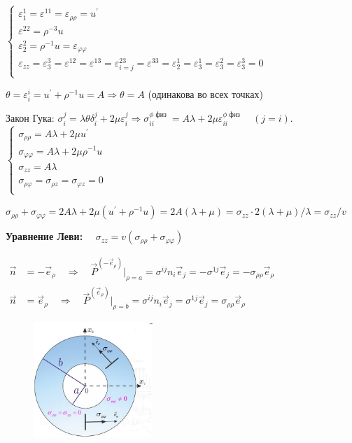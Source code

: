$\left\{\begin{array}{c}
   \varepsilon_1^1=\varepsilon^{11}=\varepsilon_{\rho \rho}=u^{\prime} \\
   \varepsilon^{22}=\rho^{-3} u \\
     \varepsilon_2^2=\rho^{-1} u=\varepsilon_{\varphi \varphi}\\
      \varepsilon_{z z}=\varepsilon_3^3=\varepsilon^{12}=\varepsilon^{13}=\varepsilon_{i=j}^{23}=\varepsilon^{33}=\varepsilon_2^1=\varepsilon_3^1=\varepsilon_3^2=\varepsilon_3^3=0 \\
        \end{array}\right.$


$\theta=\varepsilon_i^i=u^{\prime}+\rho^{-1} u=A \Rightarrow \theta=A $
(одинакова во всех точках)

Закон Гука:
$
\sigma_i^j=\lambda \theta \delta_i^j+2 \mu \varepsilon_i^j \Rightarrow \sigma_{i i}^{\phi \text { физ }}=A \lambda+2 \mu \varepsilon_{i i}^{\phi \text { физ }} \quad(j=i) \text {. } 
$
$\left\{ \begin{array}{c}
    \sigma_{\rho \rho}=A \lambda+2 \mu u^{\prime}\\
     \sigma_{\varphi \varphi}=A \lambda+2 \mu \rho^{-1} u  \\
   \sigma_{z z}=A \lambda \\
    \sigma_{\rho \varphi}=\sigma_{\rho z}=\sigma_{\varphi z}=0 \\
        \end{array}\right.
$ 


$
\sigma_{\rho \rho}+\sigma_{\varphi \varphi}=2 A \lambda+2 \mu\left(u^{\prime}+\rho^{-1} u\right)=2 A(\lambda+\mu)=\sigma_{z z} \cdot 2(\lambda+\mu) / \lambda=\sigma_{z z} / v
$


\textbf{Уравнение Леви:} $\quad \sigma_{z z}=v\left(\sigma_{\rho \rho}+\sigma_{\varphi \varphi}\right)$



$
\begin{aligned}
\vec{n} &= -\vec{e}_\rho \quad \Rightarrow \quad \vec{P}^{(-\vec{e}_\rho)}\Big|_{\rho=a} = \sigma^{ij} n_i \vec{e}_j = -\sigma^{1j} \vec{e}_j = -\sigma_{\rho\rho} \vec{e}_\rho \\
\vec{n} &= \vec{e}_\rho \quad \Rightarrow \quad \vec{P}^{(\vec{e}_\rho)}\Big|_{\rho=b} = \sigma^{ij} n_i \vec{e}_j = \sigma^{1j} \vec{e}_j = \sigma_{\rho\rho} \vec{e}_\rho
\end{aligned}$

\begin{figure}[h!]
  \centering
  \includegraphics[width=0.4\textwidth]{images/18.2.jpg}
\end{figure}


